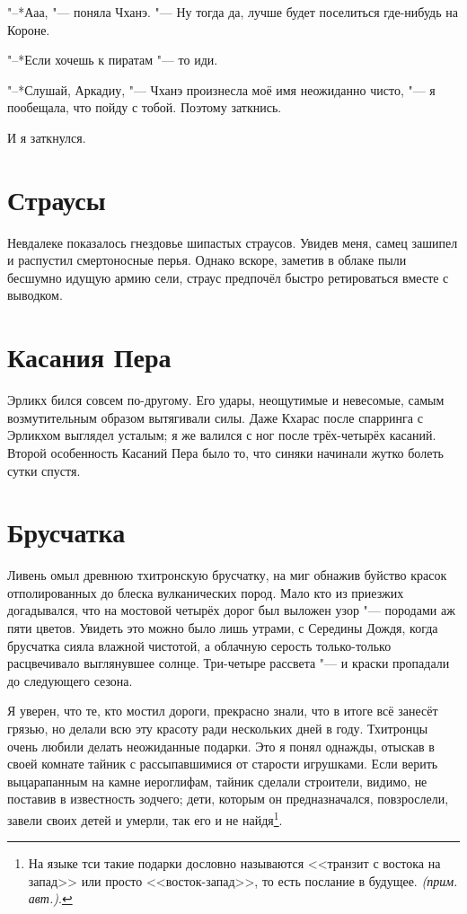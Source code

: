 \documentclass[a4paper,10pt,fleqn]{book}
\newcommand{\authornote}{\textit{(прим. авт.)}}
\begin{document}
"--*Ааа, "--- поняла Чханэ.
"--- Ну тогда да, лучше будет поселиться где-нибудь на Короне.

"--*Если хочешь к пиратам "--- то иди.

"--*Слушай, Аркадиу, "--- Чханэ произнесла моё имя неожиданно чисто, "--- я пообещала, что пойду с тобой.
Поэтому заткнись.

И я заткнулся.

\section{Страусы}

Невдалеке показалось гнездовье шипастых страусов.
Увидев меня, самец зашипел и распустил смертоносные перья.
Однако вскоре, заметив в облаке пыли бесшумно идущую армию сели, страус предпочёл быстро ретироваться вместе с выводком.

\section{Касания Пера}

Эрликх бился совсем по-другому.
Его удары, неощутимые и невесомые, самым возмутительным образом вытягивали силы.
Даже Кхарас после спарринга с Эрликхом выглядел усталым;
я же валился с ног после трёх-четырёх касаний.
Второй особенность Касаний Пера было то, что синяки начинали жутко болеть сутки спустя.

\section{Брусчатка}

Ливень омыл древнюю тхитронскую брусчатку, на миг обнажив буйство красок отполированных до блеска вулканических пород.
Мало кто из приезжих догадывался, что на мостовой четырёх дорог был выложен узор "--- породами аж пяти цветов.
Увидеть это можно было лишь утрами, с Середины Дождя, когда брусчатка сияла влажной чистотой, а облачную серость только-только расцвечивало выглянувшее солнце.
Три-четыре рассвета "--- и краски пропадали до следующего сезона.

Я уверен, что те, кто мостил дороги, прекрасно знали, что в итоге всё занесёт грязью, но делали всю эту красоту ради нескольких дней в году.
Тхитронцы очень любили делать неожиданные подарки.
Это я понял однажды, отыскав в своей комнате тайник с рассыпавшимися от старости игрушками.
Если верить выцарапанным на камне иероглифам, тайник сделали строители, видимо, не поставив в известность зодчего;
дети, которым он предназначался, повзрослели, завели своих детей и умерли, так его и не найдя\footnote
{На языке тси такие подарки дословно называются <<транзит с востока на запад>> или просто <<восток-запад>>, то есть послание в будущее. \authornote.}.
\end{document}
